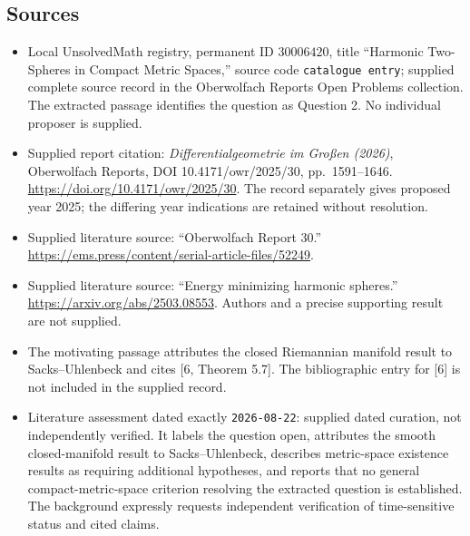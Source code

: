 \documentclass[11pt]{article}
\begin{document}
\subsection{Sources}
\begin{itemize}
\item Local UnsolvedMath registry, permanent ID \(30006420\), title ``Harmonic Two-Spheres in Compact Metric Spaces,'' source code \texttt{catalogue entry}; supplied complete source record in the Oberwolfach Reports Open Problems collection. The extracted passage identifies the question as Question 2. No individual proposer is supplied.
\item Supplied report citation: \emph{Differentialgeometrie im Großen (2026)}, Oberwolfach Reports, DOI 10.4171/owr/2025/30, pp.\ 1591--1646. \url{https://doi.org/10.4171/owr/2025/30}. The record separately gives proposed year 2025; the differing year indications are retained without resolution.
\item Supplied literature source: ``Oberwolfach Report 30.'' \url{https://ems.press/content/serial-article-files/52249}.
\item Supplied literature source: ``Energy minimizing harmonic spheres.'' \url{https://arxiv.org/abs/2503.08553}. Authors and a precise supporting result are not supplied.
\item The motivating passage attributes the closed Riemannian manifold result to Sacks--Uhlenbeck and cites [6, Theorem 5.7]. The bibliographic entry for [6] is not included in the supplied record.
\item Literature assessment dated exactly \texttt{2026-08-22}: supplied dated curation, not independently verified. It labels the question open, attributes the smooth closed-manifold result to Sacks--Uhlenbeck, describes metric-space existence results as requiring additional hypotheses, and reports that no general compact-metric-space criterion resolving the extracted question is established. The background expressly requests independent verification of time-sensitive status and cited claims.
\end{itemize}
\end{document}
